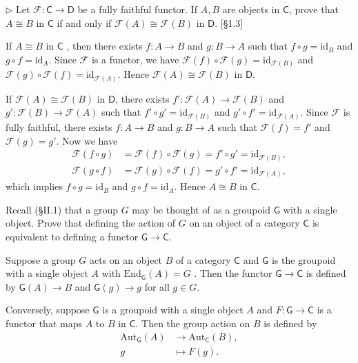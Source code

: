 \begin{problem}[1.2]
$\triangleright$ Let $\mathscr{F}: \mathsf{C} \rightarrow \mathsf{D}$ be a fully faithful functor. If $A, B$ are objects in $\mathsf{C}$, prove that $A \cong B$ in $\mathsf{C}$ if and only if $\mathscr{F}(A) \cong \mathscr{F}(B)$ in $\mathsf{D}$. [\S1.3]
\end{problem}
\begin{solution}
	If  $A \cong B$ in $\mathsf{C}$ , then there exists $f:A\to B$ and $g:B\to A$ such that $f\circ g=\mathrm{id}_B$ and $g\circ f=\mathrm{id}_A$. Since $\mathscr{F}$ is a functor, we have $\mathscr{F}(f)\circ\mathscr{F}(g)=\mathrm{id}_{\mathscr{F}(B)}$
	and $\mathscr{F}(g)\circ\mathscr{F}(f)=\mathrm{id}_{\mathscr{F}(A)}$. Hence  $\mathscr{F}(A) \cong \mathscr{F}(B)$ in $\mathsf{D}$.

	If $\mathscr{F}(A) \cong \mathscr{F}(B)$ in $\mathsf{D}$, there exists $f':\mathscr{F}(A)\to\mathscr{F}(B)$ and $g':\mathscr{F}(B)\to\mathscr{F}(A)$ such that $f'\circ g'=\mathrm{id}_{\mathscr{F}(B)}$ and $g'\circ f'=\mathrm{id}_{\mathscr{F}(A)}$. Since $\mathscr{F}$ is fully faithful, there exists $f:A\to B$ and $g:B\to A$ such that $\mathscr{F}(f)=f'$ and $\mathscr{F}(g)=g'$. Now we have
	\begin{align*}
		\mathscr{F}\left(f\circ g\right)&=\mathscr{F}(f)\circ\mathscr{F}(g)=f'\circ g'=\mathrm{id}_{\mathscr{F}(B)},\\
		\mathscr{F}\left(g\circ f\right)&=\mathscr{F}(g)\circ\mathscr{F}(f)=g'\circ f'=\mathrm{id}_{\mathscr{F}(A)},
	\end{align*}
	which implies $f\circ g=\mathrm{id}_B$ and $g\circ f=\mathrm{id}_A$. Hence $A \cong B$ in $\mathsf{C}$.
\end{solution}


\begin{problem}[1.3]
Recall (\S II.1) that a group $G$ may be thought of as a groupoid $\mathsf{G}$ with a single object. Prove that defining the action of $G$ on an object of a category $\mathsf{C}$ is equivalent to defining a functor $\mathsf{G} \rightarrow \mathsf{C}$.
\end{problem}
\begin{solution}
	Suppose a group $G$ acts on an object $B$ of a category $\mathsf{C}$ and $\mathsf{G}$ is the groupoid with a single object $A$ with $\mathrm{End}_{\mathsf{G}}(A)=G$ . Then the functor $\mathsf{G} \rightarrow \mathsf{C}$ is defined by $\mathsf{G}(A) \rightarrow B$ and $\mathsf{G}(g) \rightarrow g$ for all $g \in G$. 
	
	Conversely, suppose $\mathsf{G}$ is a groupoid with a single object $A$ and $F:\mathsf{G} \rightarrow \mathsf{C}$ is a functor that maps $A$ to $B$ in $\mathsf{C}$. Then the group action on $B$ is defined by 
	\begin{align*}
		\mathrm{Aut}_{\mathsf{G}}(A) &\longrightarrow \mathrm{Aut}_{\mathsf{C}}(B),\\
		g &\longmapsto F(g).
	\end{align*}
\end{solution}



